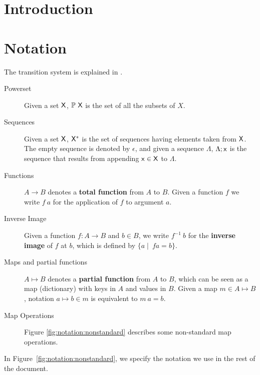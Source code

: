 \documentclass[11pt,a4paper,dvipsnames]{article}
\theoremstyle{definition}
\theoremstyle{definition}
\begin{document}


\tableofcontents
\listoffigures

\section{Introduction}
\label{sec:introduction}


\section{Notation}\label{sec:notation}

The transition system is explained in \cite{small_step_semantics}.

\begin{description}
\item[Powerset] Given a set $\mathsf{X}$, $\mathbb{P}~\mathsf{X}$ is the set of all
  the subsets of $X$.
\item[Sequences] Given a set $\mathsf{X}$, $\mathsf{X}^{*}$ is the set of
  sequences having elements taken from $\mathsf{X}$. The empty sequence is
  denoted by $\epsilon$, and given a sequence $\Lambda$, $\Lambda; \mathsf{x}$ is
  the sequence that results from appending $\mathsf{x} \in \mathsf{X}$ to
  $\Lambda$.
\item[Functions] $A \to B$ denotes a \textbf{total function} from $A$ to $B$.
  Given a function $f$ we write $f~a$ for the application of $f$ to argument
  $a$.
\item[Inverse Image] Given a function $f: A \to B$ and $b\in B$, we write
  $f^{-1}~b$ for the \textbf{inverse image} of $f$ at $b$, which is defined by
  $\{a \mid\ f a =  b\}$.
\item[Maps and partial functions] $A \mapsto B$ denotes a \textbf{partial
    function} from $A$ to $B$, which can be seen as a map (dictionary) with
  keys in $A$ and values in $B$. Given a map $m \in A \mapsto B$, notation
  $a \mapsto b \in m$ is equivalent to $m~ a = b$.
\item[Map Operations] Figure \ref{fig:notation:nonstandard}
  describes some non-standard map operations.

\end{description}

In Figure~\ref{fig:notation:nonstandard}, we specify the notation we use in
the rest of the document.
\end{document}
